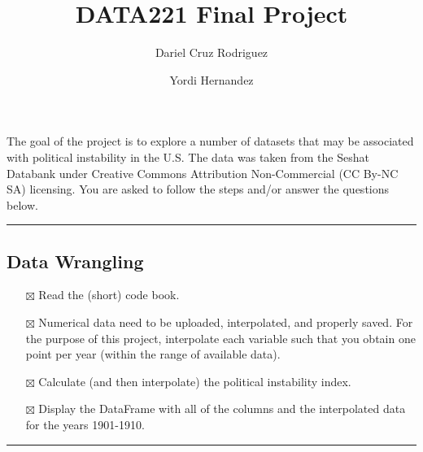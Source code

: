 \documentclass[
  letterpaper,
  DIV=11,
  numbers=noendperiod]{scrartcl}
\title{DATA221 Final Project}
\author{Dariel Cruz Rodriguez \and Yordi Hernandez}
\date{}
\providecommand{\tightlist}{%
  \setlength{\itemsep}{0pt}\setlength{\parskip}{0pt}}\usepackage{longtable,booktabs,array}
\begin{document}
\maketitle


The goal of the project is to explore a number of datasets that may be
associated with political instability in the U.S. The data was taken
from the Seshat Databank under Creative Commons Attribution
Non-Commercial (CC By-NC SA) licensing. You are asked to follow the
steps and/or answer the questions below.

\begin{center}\rule{0.5\linewidth}{0.5pt}\end{center}

\subsection{Data Wrangling}\label{data-wrangling}

\begin{itemize}
\tightlist
\item[$\boxtimes$]
  Read the (short) code book.
\item[$\boxtimes$]
  Numerical data need to be uploaded, interpolated, and properly saved.
  For the purpose of this project, interpolate each variable such that
  you obtain one point per year (within the range of available data).
\item[$\boxtimes$]
  Calculate (and then interpolate) the political instability index.
\item[$\boxtimes$]
  Display the DataFrame with all of the columns and the interpolated
  data for the years 1901-1910.
\end{itemize}

\begin{center}\rule{0.5\linewidth}{0.5pt}\end{center}
\end{document}
